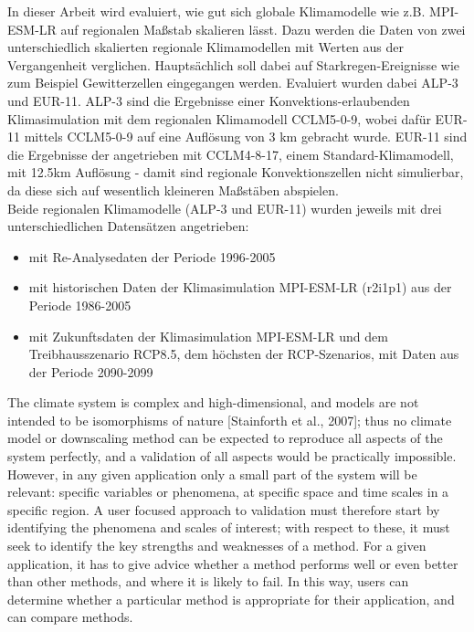 In dieser Arbeit wird evaluiert, wie gut sich globale Klimamodelle wie z.B. MPI-ESM-LR auf regionalen Maßstab skalieren lässt. Dazu werden die Daten von zwei unterschiedlich skalierten regionale Klimamodellen mit Werten aus der Vergangenheit verglichen. Hauptsächlich soll dabei auf Starkregen-Ereignisse wie zum Beispiel Gewitterzellen eingegangen werden. Evaluiert wurden dabei ALP-3 und EUR-11. ALP-3 sind  die Ergebnisse einer Konvektions-erlaubenden Klimasimulation mit dem regionalen Klimamodell CCLM5-0-9, wobei dafür EUR-11 mittels CCLM5-0-9 auf eine Auflösung von 3 km gebracht wurde. EUR-11 sind die Ergebnisse der angetrieben mit CCLM4-8-17, einem Standard-Klimamodell, mit 12.5km Auflösung - damit sind regionale Konvektionszellen nicht simulierbar, da diese sich auf wesentlich kleineren Maßstäben abspielen.\\
Beide regionalen Klimamodelle (ALP-3 und EUR-11) wurden jeweils mit drei unterschiedlichen Datensätzen angetrieben: 
\begin{itemize}
	\item mit Re-Analysedaten der Periode 1996-2005
	\item mit historischen Daten der Klimasimulation MPI-ESM-LR (r2i1p1) aus der Periode 1986-2005
	\item mit Zukunftsdaten der Klimasimulation MPI-ESM-LR und dem Treibhausszenario RCP8.5, dem höchsten der RCP-Szenarios, mit Daten aus der Periode 2090-2099
\end{itemize}

The climate system is complex and high-dimensional, and models are not intended to be isomorphisms of nature [Stainforth et al., 2007]; thus no climate model or downscaling method can be expected to
reproduce all aspects of the system perfectly, and a validation of all aspects would be practically impossible. However, in any given application only a small part of the system will be relevant: specific variables or phenomena, at specific space and time scales in a specific region. A user focused approach to validation must therefore start by identifying the phenomena and scales of interest; with respect to these, it must seek to identify the key strengths and weaknesses of a method. For a given application, it has to give advice whether a method performs well or even better than other methods, and where it is likely to fail. In this way, users can determine whether a particular method is appropriate for their application, and
can compare methods.